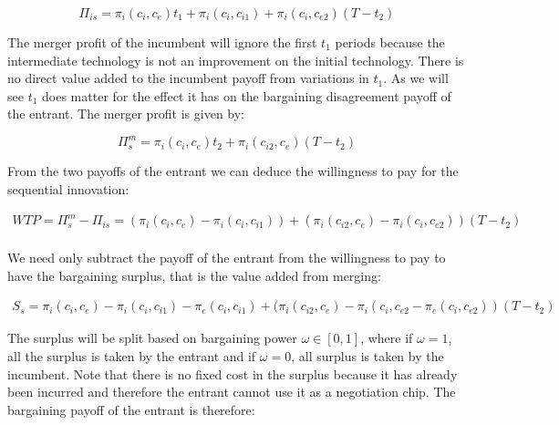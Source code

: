 \begin{equation*}
\Pi_{is} = \pi_i(c_i,c_{e})t_1+\pi_i(c_i,c_{i1}) +\pi_i(c_i,c_{e2})(T-t_2)
\end{equation*}

The merger profit of the incumbent will ignore the first $t_1$ periods because the intermediate technology is not an improvement on the initial technology. There is no direct value added to the incumbent payoff from variations in $t_1$. As we will see $t_1$ does matter for the effect it has on the bargaining disagreement payoff of the entrant. The merger profit is given by: 

\begin{equation*}
\Pi_{s}^m= \pi_i(c_i,c_{e}) t_2+\pi_i(c_{i2},c_e)(T-t_2)
\end{equation*}

From the two payoffs of the entrant we can deduce the willingness to pay for the sequential innovation: 


\begin{align*}
WTP=\Pi_{s}^m-\Pi_{is} = (\pi_i(c_i,c_{e})-\pi_i(c_i,c_{i1}))+(\pi_i(c_{i2},c_e)-\pi_i(c_{i},c_{e2}))(T-t_2) \\
\end{align*}

We need only subtract the payoff of the entrant from the willingness to pay to have the bargaining surplus, that is the value added from merging:


\begin{align*}
S_s= \pi_i(c_i,c_{e})-\pi_i(c_i,c_{i1})-\pi_e(c_i,c_{i1})+(\pi_i(c_{i2},c_e)-\pi_i(c_{i},c_{e2}-\pi_e(c_{i},c_{e2}))(T-t_2) 
\end{align*}

The surplus will be split based on bargaining power $\omega \in [0,1]$, where if $\omega = 1$, all the surplus is taken by the entrant and if $\omega = 0$, all surplus is taken by the incumbent. Note that there is no fixed cost in the surplus because it has already been incurred and therefore the entrant cannot use it as a negotiation chip. The bargaining payoff of the entrant is therefore:

